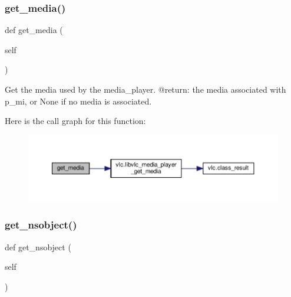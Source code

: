 \subsubsection{\texorpdfstring{get\+\_\+media()}{get\_media()}}
{\footnotesize\ttfamily def get\+\_\+media (\begin{DoxyParamCaption}\item[{}]{self }\end{DoxyParamCaption})}

\begin{DoxyVerb}Get the media used by the media_player.
@return: the media associated with p_mi, or None if no media is associated.
\end{DoxyVerb}
 Here is the call graph for this function\+:
\nopagebreak
\begin{figure}[H]
\begin{center}
\leavevmode
\includegraphics[width=350pt]{classvlc_1_1_media_player_a1fa2f551dca8d895dc9639984cfb819b_cgraph}
\end{center}
\end{figure}
\mbox{\label{classvlc_1_1_media_player_aa4c7fba6bb178e5df3d8ff9262fd9e86}} 
\subsubsection{\texorpdfstring{get\+\_\+nsobject()}{get\_nsobject()}}
{\footnotesize\ttfamily def get\+\_\+nsobject (\begin{DoxyParamCaption}\item[{}]{self }\end{DoxyParamCaption})}

